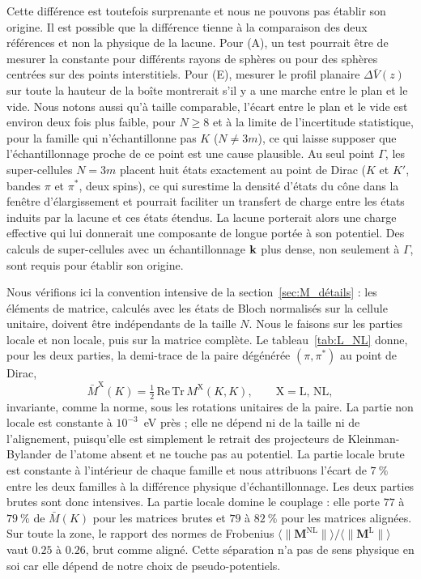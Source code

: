 Cette différence est toutefois surprenante et nous ne pouvons pas établir son origine.
Il est possible que la différence tienne à la comparaison des deux références et non la physique de la lacune. Pour (A), un test pourrait être de mesurer la constante pour différents rayons de sphères ou pour des sphères centrées sur des points interstitiels. Pour (E), mesurer le profil planaire $\Delta \bar V(z)$ sur toute la hauteur de la boîte montrerait s'il y a une marche entre le plan et le vide. Nous notons aussi qu'à taille comparable, l'écart entre le plan et le vide est environ deux fois plus faible, pour $N\geq 8$ et à la limite de l'incertitude statistique, pour la famille qui n'échantillonne pas $K$ ($N\neq 3m$), ce qui laisse supposer que l'échantillonnage proche de ce point est une cause plausible. Au seul point $\Gamma$, les super-cellules $N=3m$ placent huit états exactement au point de Dirac ($K$ et $K'$, bandes $\pi$ et $\pi^*$, deux spins), ce qui surestime la densité d'états du cône dans la fenêtre d'élargissement et pourrait faciliter un transfert de charge entre les états induits par la lacune et ces états étendus. La lacune porterait alors une charge effective qui lui donnerait une composante de longue portée à son potentiel. Des calculs de super-cellules avec un échantillonnage $\mathbf{k}$ plus dense, non seulement à $\Gamma$, sont requis pour établir son origine.

\bigskip
{}

Nous vérifions ici la convention intensive de la section~\ref{sec:M_détails} : les éléments de matrice, calculés avec les états de Bloch normalisés sur la cellule unitaire, doivent être indépendants de la taille $N$. Nous le faisons sur les parties locale et non locale, puis sur la matrice complète. Le tableau~\ref{tab:L_NL} donne, pour les deux parties, la demi-trace de la paire dégénérée $(\pi,\pi^*)$ au point de Dirac,
\begin{equation}
    \bar M^\text{X}(K) = \tfrac{1}{2}\,\mathrm{Re}\,\mathrm{Tr}\,M^\text{X}(K,K),\qquad \text{X}=\text{L},\,\text{NL},\label{eqn:M_bar}
\end{equation}
invariante, comme la norme, sous les rotations unitaires de la paire. La partie non locale est constante à $10^{-3}$~eV près ; elle ne dépend ni de la taille ni de l'alignement, puisqu'elle est simplement le retrait des projecteurs de Kleinman-Bylander de l'atome absent et ne touche pas au potentiel. La partie locale brute est constante à l'intérieur de chaque famille et nous attribuons l'écart de $7~\%$ entre les deux familles à la différence physique d'échantillonnage. Les deux parties brutes sont donc intensives. La partie locale domine le couplage : elle porte $77$ à $79~\%$ de $\bar M(K)$ pour les matrices brutes et $79$ à $82~\%$ pour les matrices alignées. Sur toute la zone, le rapport des normes de Frobenius $\langle\|\bm M^\text{NL}\|\rangle/\langle\|\bm M^\text{L}\|\rangle$ vaut $0.25$ à $0.26$, brut comme aligné. Cette séparation n'a pas de sens physique en soi car elle dépend de notre choix de pseudo-potentiels.

